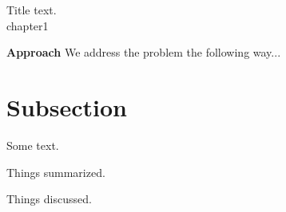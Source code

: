 \begin{chaptercover}{Title}%
{
{\large {} text. \newline \\}}%
{chapter1}


\begin{tip}
\textbf{Approach} \newline \linebreak We address the problem the following way...
\end{tip}


\section{Subsection}
Some text.


\begin{summary}
Things summarized.
\end{summary}


\begin{discussion}
Things discussed.
\end{discussion}


\end{chaptercover}
